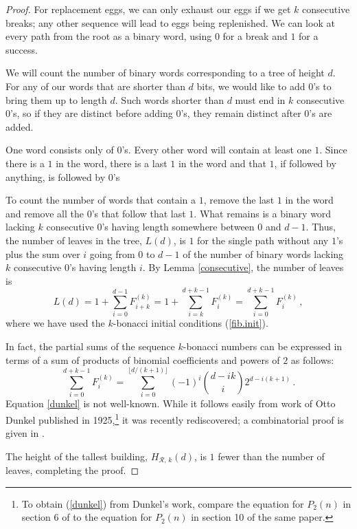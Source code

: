 \documentclass[12pt]{amsart}
\theoremstyle{definition}
\theoremstyle{theorem}
\begin{document}
\begin{proof}
For replacement eggs, we can only exhaust our eggs if we get $k$ consecutive breaks; 
any other sequence will lead to eggs being replenished. We can look at every path from the 
root as a binary word, using $0$ for a break and $1$ for a success. 

We will count the number of binary words corresponding to a tree of height $d$. 
For any of our words that are shorter than $d$ bits, we would like to add
$0$'s to bring them up to length $d$. Such words shorter than
$d$ must end in $k$ consecutive $0$'s, so if they are distinct
before adding $0$'s, they remain distinct after $0$'s are added.

One word consists only of $0$'s.   Every other word
will contain at least one $1$. Since there is a $1$ in the word, 
there is a last $1$ in the word and that $1$,
if followed by anything, is followed by $0$'s

To count the number of words that contain a $1$, remove the last $1$ in the
word and remove all the $0$'s that follow that last $1$.
What remains is 
a binary word lacking $k$ consecutive $0$'s having length somewhere between $0$ and $d-1$.
Thus, the number of leaves in the tree, $L(d)$, is  $1$ for the single path without any $1$'s plus
the sum over $i$ going from $0$ to $d-1$ of the number of  binary words 
lacking $k$ consecutive $0$'s having length $i$. By Lemma \ref{consecutive}, the number
of leaves is
$$
L(d) = 1+ \sum_{i=0}^{d-1}  F^{(k)}_{i + k} 
= 1+ \sum_{i=k}^{d+k-1}  F^{(k)}_{i}
=   \sum_{i=0}^{d+k-1}  F^{(k)}_{i}
\,,
$$
where we have used the $k$-bonacci initial conditions (\ref{fib.init}).

In fact, the partial sums of the sequence  $k$-bonacci numbers can be expressed in terms of
a sum of products of binomial coefficients and powers of $2$ as follows:
\begin{equation}\label{dunkel}
\sum_{i=0}^{d+k-1}  F^{(k)}_{i} =  \sum_{i=0}^{\lfloor d/(k+1) \rfloor} (-1)^{i} \binom{d-ik}{i}2^{d-i(k+1)}
\,.
\end{equation}
Equation \ref{dunkel} is not well-known. 
While it follows easily from work of 
Otto Dunkel published in 1925,\footnote{To obtain (\ref{dunkel}) from Dunkel's work,
compare the equation for $P_2(n)$ in section 6 of \cite{dunkel1925solutions}
to the equation for 
$P_2(n)$ in section 10 of the same paper.} it 
was recently rediscovered; a combinatorial 
proof is given in  \cite{https://doi.org/10.48550/arxiv.2208.01224}.

The height of the tallest building, $H_{{\mathcal R},\,k}(d)$,  is $1$ fewer than the
number of leaves, completing the proof.
\end{proof}
\end{document}
